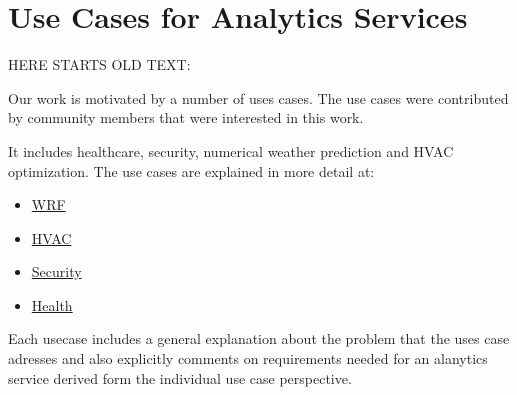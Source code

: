 

\section{Use Cases for Analytics Services}
\label{sec:usecases}







HERE STARTS OLD TEXT:

Our work is motivated by a number of uses cases. The use cases were
contributed by community members that were interested in this work.


It includes healthcare, security, numerical weather prediction and
HVAC optimization. The use cases are explained in more detail at:

\begin{itemize}
\item \href{https://github.com/cyberaide/NIST-analytics/blob/main/usecase/weather.tex}{WRF \ExternalLink}
\item \href{https://github.com/cyberaide/NIST-analytics/blob/main/usecase/hvac.tex}{HVAC \ExternalLink}
\item \href{https://github.com/cyberaide/NIST-analytics/blob/main/usecase/security.tex}{Security \ExternalLink}
\item \href{https://github.com/cyberaide/NIST-analytics/blob/main/usecase/health.tex}{Health \ExternalLink}
\end{itemize}

Each usecase includes a general explanation about the problem that the
uses case adresses and also explicitly comments on requirements needed
for an alanytics service derived form the individual use case
perspective.


